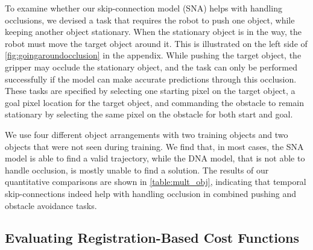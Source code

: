 To examine whether our skip-connection model (SNA) helps with handling occlusions, we devised a task that requires the robot to push one object, while keeping another object stationary. When the stationary object is in the way, the robot must move the target object around it. This is illustrated on the left side of \autoref{fig:goingaroundocclusion} in the appendix. While pushing the target object, the gripper may occlude the stationary object, and the task can only be performed successfully if the model can make accurate predictions through this occlusion. These tasks are specified by selecting one starting pixel on the target object, a goal pixel location for the target object, and commanding the obstacle to remain stationary by selecting the same pixel on the obstacle for both start and goal. 

We use four different object arrangements with two training objects and two objects that were not seen during training. We find that, in most cases, the SNA model is able to find a valid trajectory, while the DNA model, that is not able to handle occlusion, is mostly unable to find a solution. The results of our quantitative comparisons are shown in \autoref{table:mult_obj}, indicating that temporal skip-connections indeed help with handling occlusion in combined pushing and obstacle avoidance tasks. 

\subsection{Evaluating Registration-Based Cost Functions}
\label{susbsec:reg_cost_exp}

